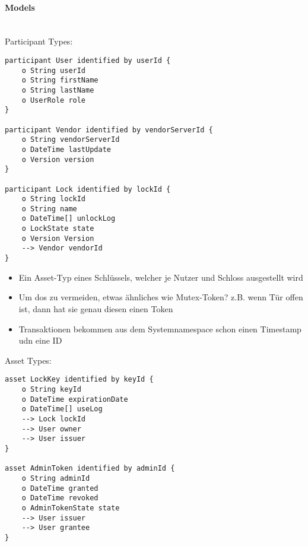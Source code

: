         \paragraph{\textrm{Models}}\hspace{0cm}\smallskip\\
            Participant Types:
            \begin{lstlisting}[caption={Participant Types},label=prototype_pariticipants,captionpos=b]
participant User identified by userId {
    o String userId
    o String firstName
    o String lastName
	o UserRole role
}

participant Vendor identified by vendorServerId {
	o String vendorServerId
	o DateTime lastUpdate
	o Version version
}

participant Lock identified by lockId {
    o String lockId
    o String name
    o DateTime[] unlockLog
	o LockState state
	o Version Version
	--> Vendor vendorId
}
        \end{lstlisting}
            
            \begin{itemize}[noitemsep]
                \item Ein Asset-Typ eines Schlüssels, welcher je Nutzer und Schloss ausgestellt wird
                \item Um \gls{dos} zu vermeiden, etwas ähnliches wie Mutex-Token? z.B. wenn Tür offen ist, dann hat sie genau diesen einen Token
                \item Transaktionen bekommen aus dem Systemnamespace schon einen Timestamp udn eine ID
            \end{itemize}
            
            Asset Types:
            \begin{lstlisting}[caption={Asset Types},label=prototype_assets,captionpos=b]
asset LockKey identified by keyId {
    o String keyId
    o DateTime expirationDate
    o DateTime[] useLog
    --> Lock lockId
    --> User owner
    --> User issuer
}

asset AdminToken identified by adminId {
	o String adminId
	o DateTime granted
	o DateTime revoked
	o AdminTokenState state
	--> User issuer
    --> User grantee
}
            \end{lstlisting}
        
